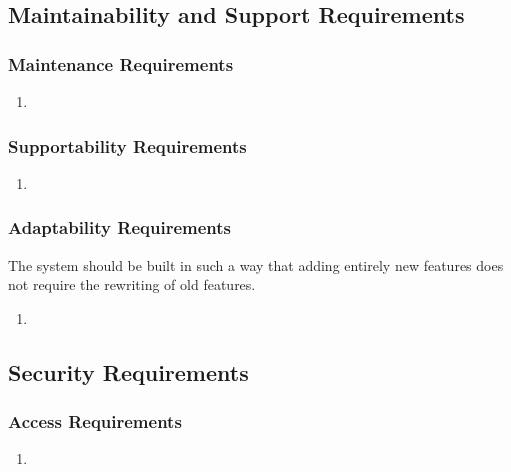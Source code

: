 \documentclass[english]{article}
\begin{document}
\subsection{Maintainability and Support Requirements}
\label{sub:maintainability_and_support_requirements}

\subsubsection{Maintenance Requirements}
\label{ssub:maintenance_requirements}
\begin{enumerate}[{MS}1. ]
	\item 
\end{enumerate}

\subsubsection{Supportability Requirements}
\label{ssub:supportability_requirements}
\begin{enumerate}[{MS}1. ]
	\item 
\end{enumerate}

\subsubsection{Adaptability Requirements}
\label{ssub:adaptability_requirements}
The system should be built in such a way that adding entirely new features does not require the rewriting of old features. 
\begin{enumerate}[{MS}1. ]
	\item 
\end{enumerate}


\subsection{Security Requirements}
\label{sub:security_requirements}

\subsubsection{Access Requirements}
\label{ssub:access_requirements}
\begin{enumerate}[{SR}1. ]
	\item 
\end{enumerate}
\end{document}
